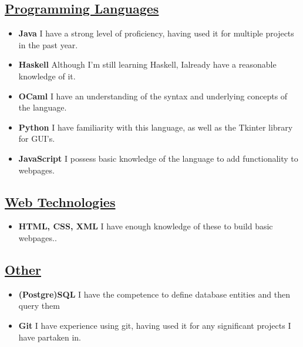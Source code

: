 \documentclass[11pt]{article}
\begin{document}
		\subsection*{\underline{Programming Languages}}
		\begin{itemize}
			\item \textbf{Java} I have a strong level of proficiency, having used it for multiple projects in the past year.
			\item \textbf{Haskell} Although I'm still learning Haskell, Ialready have a reasonable knowledge of it.
			\item \textbf{OCaml} I have an understanding of the syntax and underlying concepts of the language.
			\item \textbf{Python} I have familiarity with this language, as well as the Tkinter library for GUI's. 
			\item \textbf{JavaScript} I possess basic knowledge of the language to add functionality to webpages.
		\end{itemize} 
		\subsection*{\underline{Web Technologies}}
		\begin{itemize}
			\item \textbf{HTML, CSS, XML} I have enough knowledge of these to build basic webpages..
		\end{itemize}
		\subsection*{\underline{Other}}
		\begin{itemize}
			\item \textbf{(Postgre)SQL} I have the competence to define database entities and then query them
			\item \textbf{Git} I have experience using git, having used it for any significant projects I have partaken in.
		\end{itemize}
\end{document}
